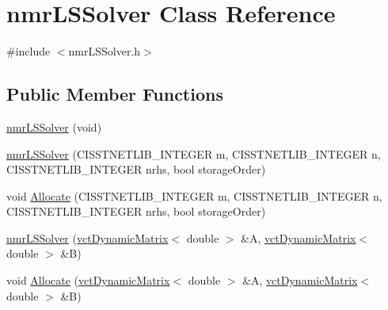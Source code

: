 \hypertarget{classnmr_l_s_solver}{\section{nmr\-L\-S\-Solver Class Reference}
\label{classnmr_l_s_solver}
}


{\ttfamily \#include $<$nmr\-L\-S\-Solver.\-h$>$}

\subsection*{Public Member Functions}
\begin{DoxyCompactItemize}
\item 
\hyperlink{classnmr_l_s_solver_a1f0d69b7a362dab5edb72af3ecf00527}{nmr\-L\-S\-Solver} (void)
\item 
\hyperlink{classnmr_l_s_solver_ac462b55b1440d64521aa9e8ee4f4d222}{nmr\-L\-S\-Solver} (C\-I\-S\-S\-T\-N\-E\-T\-L\-I\-B\-\_\-\-I\-N\-T\-E\-G\-E\-R m, C\-I\-S\-S\-T\-N\-E\-T\-L\-I\-B\-\_\-\-I\-N\-T\-E\-G\-E\-R n, C\-I\-S\-S\-T\-N\-E\-T\-L\-I\-B\-\_\-\-I\-N\-T\-E\-G\-E\-R nrhs, bool storage\-Order)
\item 
void \hyperlink{classnmr_l_s_solver_a0ee08c078dcb9256504a06d3c77ac102}{Allocate} (C\-I\-S\-S\-T\-N\-E\-T\-L\-I\-B\-\_\-\-I\-N\-T\-E\-G\-E\-R m, C\-I\-S\-S\-T\-N\-E\-T\-L\-I\-B\-\_\-\-I\-N\-T\-E\-G\-E\-R n, C\-I\-S\-S\-T\-N\-E\-T\-L\-I\-B\-\_\-\-I\-N\-T\-E\-G\-E\-R nrhs, bool storage\-Order)
\end{DoxyCompactItemize}
{\bf }\par
\begin{DoxyCompactItemize}
\item 
\hyperlink{classnmr_l_s_solver_a341c5d3ce07e36febb3ff1136d739638}{nmr\-L\-S\-Solver} (\hyperlink{classvct_dynamic_matrix}{vct\-Dynamic\-Matrix}$<$ double $>$ \&A, \hyperlink{classvct_dynamic_matrix}{vct\-Dynamic\-Matrix}$<$ double $>$ \&B)
\end{DoxyCompactItemize}

{\bf }\par
\begin{DoxyCompactItemize}
\item 
void \hyperlink{classnmr_l_s_solver_a6bde52519284ac538466e6608f78a72d}{Allocate} (\hyperlink{classvct_dynamic_matrix}{vct\-Dynamic\-Matrix}$<$ double $>$ \&A, \hyperlink{classvct_dynamic_matrix}{vct\-Dynamic\-Matrix}$<$ double $>$ \&B)
\end{DoxyCompactItemize}

